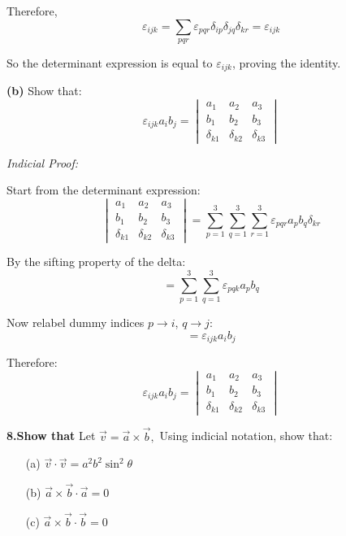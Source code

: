 \documentclass[a4paper,12pt]{article}
\begin{document}
\begin{enumerate}
Therefore,
\[
\varepsilon_{ijk} = \sum_{pqr} \varepsilon_{pqr} \delta_{ip} \delta_{jq} \delta_{kr}
= \varepsilon_{ijk}
\]

So the determinant expression is equal to \(\varepsilon_{ijk}\), proving the identity.

\vspace{1em}

\textbf{(b)} Show that:
\[
\varepsilon_{ijk} a_i b_j = 
\begin{vmatrix}
a_1 & a_2 & a_3 \\
b_1 & b_2 & b_3 \\
\delta_{k1} & \delta_{k2} & \delta_{k3}
\end{vmatrix}
\]

\textit{Indicial Proof:}

Start from the determinant expression:
\[
\begin{vmatrix}
a_1 & a_2 & a_3 \\
b_1 & b_2 & b_3 \\
\delta_{k1} & \delta_{k2} & \delta_{k3}
\end{vmatrix}
= \sum_{p=1}^{3} \sum_{q=1}^{3} \sum_{r=1}^{3} \varepsilon_{pqr} a_p b_q \delta_{kr}
\]

By the sifting property of the delta:
\[
= \sum_{p=1}^{3} \sum_{q=1}^{3} \varepsilon_{pqk} a_p b_q
\]

Now relabel dummy indices \(p \to i\), \(q \to j\):
\[
= \varepsilon_{ijk} a_i b_j
\]

Therefore:
\[
\varepsilon_{ijk} a_i b_j = 
\begin{vmatrix}
a_1 & a_2 & a_3 \\
b_1 & b_2 & b_3 \\
\delta_{k1} & \delta_{k2} & \delta_{k3}
\end{vmatrix}
\]















\textbf{8.Show that}
Let \( \vec{v} = \vec{a} \times \vec{b}, \) Using indicial notation, show that:\\
\begin{itemize}
  \item[(a)] \( \vec{v} \cdot \vec{v} = a^2 b^2 \sin^2 \theta \)
  \item[(b)] \( \vec{a} \times \vec{b} \cdot \vec{a} = 0 \)
  \item[(c)] \( \vec{a} \times \vec{b} \cdot \vec{b} = 0 \)
\end{itemize}


\end{enumerate}
\end{document}
